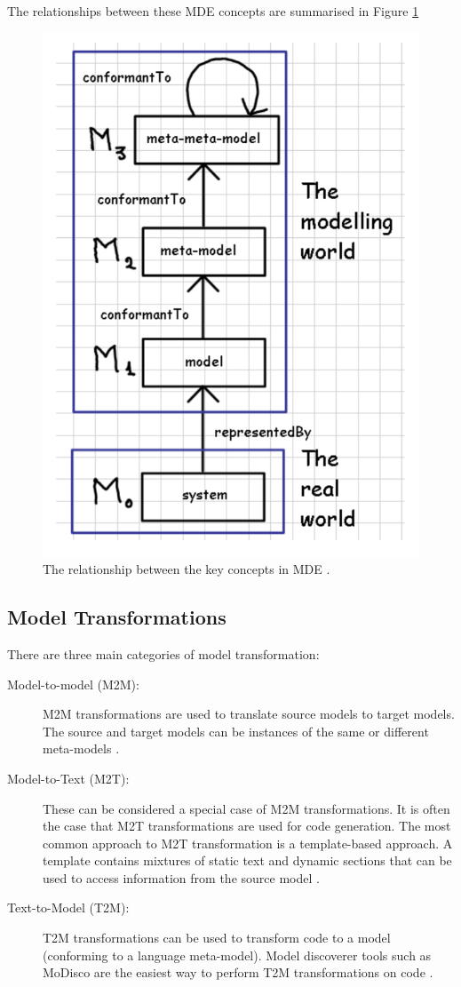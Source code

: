 \documentclass{UoYCSproject}
\begin{document}
The relationships between these MDE concepts are summarised in Figure \ref{fig:metamodel_term}

\begin{figure}[h!]
  \centering
  \includegraphics[width=0.5\linewidth]{graphics/metamodel_terminology.png}
  \caption{The relationship between the key concepts in MDE \parencite{bezivin2004search}.}
  \label{fig:metamodel_term}
\end{figure}


\subsection{Model Transformations}
There are three main categories of model transformation:
\begin{description}
\item[Model-to-model (M2M):] M2M transformations are used to translate source models to target models. The source and target models can be instances of the same or different meta-models \parencite{czarnecki2003classification}.
\item[Model-to-Text (M2T):] These can be considered a special case of M2M transformations. It is often the case that M2T transformations are used for code generation. The most common approach to M2T transformation is a template-based approach. A template contains mixtures of static text and dynamic sections that can be used to access information from the source model \parencite{czarnecki2003classification}.
\item[Text-to-Model (T2M):]  T2M transformations can be used to transform code to a model (conforming to a language meta-model). Model discoverer tools such as MoDisco \parencite{bruneliere2014modisco} are the easiest way to perform T2M transformations on code \parencite{kowalczyk2009model}.
\end{description}
\end{document}
